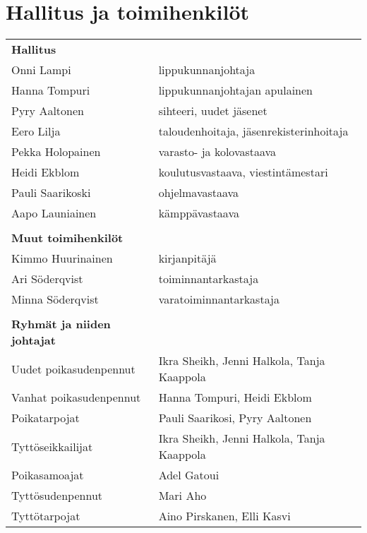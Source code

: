 \section{Hallitus ja toimihenkilöt}
\begin{center}
	\begin{tabular}{ l l }
		\textbf{Hallitus} & \\
		Onni Lampi & lippukunnanjohtaja\\
		Hanna Tompuri & lippukunnanjohtajan apulainen\\
		Pyry Aaltonen & sihteeri, uudet jäsenet\\
		Eero Lilja & taloudenhoitaja, jäsenrekisterinhoitaja\\
		Pekka Holopainen & varasto- ja kolovastaava\\
		Heidi Ekblom & koulutusvastaava, viestintämestari\\
		Pauli Saarikoski & ohjelmavastaava\\
		Aapo Launiainen & kämppävastaava\\
						     & \\
		\textbf{Muut toimihenkilöt} & \\
		Kimmo Huurinainen & kirjanpitäjä\\
		Ari Söderqvist & toiminnantarkastaja\\
		Minna Söderqvist & varatoiminnantarkastaja\\
							      & \\
		\textbf{Ryhmät ja niiden johtajat} & \\
		Uudet poikasudenpennut & Ikra Sheikh, Jenni Halkola, Tanja Kaappola\\
		Vanhat poikasudenpennut & Hanna Tompuri, Heidi Ekblom\\
		Poikatarpojat & Pauli Saarikosi, Pyry Aaltonen\\
		Tyttöseikkailijat & Ikra Sheikh, Jenni Halkola, Tanja Kaappola\\
		Poikasamoajat & Adel Gatoui\\
		Tyttösudenpennut & Mari Aho\\
		Tyttötarpojat & Aino Pirskanen, Elli Kasvi\\
	\end{tabular}
\end{center}

\newpage

